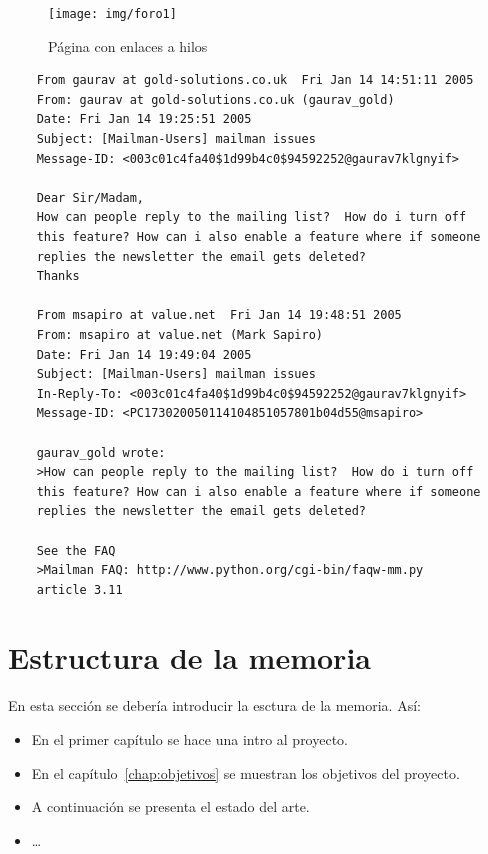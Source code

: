 \documentclass[a4paper, 12pt]{book}
\begin{document}
 \begin{figure}
    \centering
    \texttt{[image: img/foro1]}
    \caption{Página con enlaces a hilos}
    \label{figura:foro_hilos}
 \end{figure}

{\footnotesize
\begin{verbatim}
    From gaurav at gold-solutions.co.uk  Fri Jan 14 14:51:11 2005
    From: gaurav at gold-solutions.co.uk (gaurav_gold)
    Date: Fri Jan 14 19:25:51 2005
    Subject: [Mailman-Users] mailman issues
    Message-ID: <003c01c4fa40$1d99b4c0$94592252@gaurav7klgnyif>

    Dear Sir/Madam,
    How can people reply to the mailing list?  How do i turn off
    this feature? How can i also enable a feature where if someone
    replies the newsletter the email gets deleted?
    Thanks

    From msapiro at value.net  Fri Jan 14 19:48:51 2005
    From: msapiro at value.net (Mark Sapiro)
    Date: Fri Jan 14 19:49:04 2005
    Subject: [Mailman-Users] mailman issues
    In-Reply-To: <003c01c4fa40$1d99b4c0$94592252@gaurav7klgnyif>
    Message-ID: <PC173020050114104851057801b04d55@msapiro>

    gaurav_gold wrote:
    >How can people reply to the mailing list?  How do i turn off
    this feature? How can i also enable a feature where if someone
    replies the newsletter the email gets deleted?

    See the FAQ
    >Mailman FAQ: http://www.python.org/cgi-bin/faqw-mm.py
    article 3.11
\end{verbatim}
}

\section{Estructura de la memoria}
\label{sec:estructura}

En esta sección se debería introducir la esctura de la memoria. Así:

\begin{itemize}
  \item En el primer capítulo se hace una intro al proyecto.
  
  \item En el capítulo~\ref{chap:objetivos} se muestran los objetivos del proyecto.
  
  \item A continuación se presenta el estado del arte.
  
  \item \ldots
\end{itemize}
\end{document}
